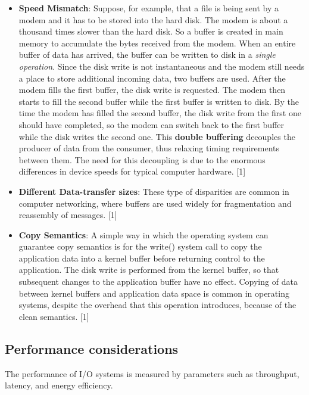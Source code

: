 \documentclass[a4paper]{article}
\begin{document}
\begin{itemize}
    \item \textbf{Speed Mismatch}: Suppose, for example, that a file is being sent
    by a modem and it has to be stored into the hard disk. The modem is about a thousand
    times slower than the hard disk. So a buffer is created in main memory to
    accumulate the bytes received from the modem. When an entire buffer of data
    has arrived, the buffer can be written to disk in a \textit{single operation}. Since the
    disk write is not instantaneous and the modem still needs a place to store
    additional incoming data, two buffers are used. After the modem fills the first
    buffer, the disk write is requested. The modem then starts to fill the second
    buffer while the first buffer is written to disk. By the time the modem has filled
    the second buffer, the disk write from the first one should have completed,
    so the modem can switch back to the first buffer while the disk writes the
    second one. This \textbf{double buffering} decouples the producer of data from the
    consumer, thus relaxing timing requirements between them. The need for this
    decoupling is due to the enormous differences
    in device speeds for typical computer hardware. [1]
    \item \textbf{Different Data-transfer sizes}: These type of disparities are common in
    computer networking, where buffers are used widely for fragmentation and
    reassembly of messages. [1]
    \item \textbf{Copy Semantics}: A simple way in which the operating system can
    guarantee copy semantics is for the write() system call to copy the application
    data into a kernel buffer before returning control to the application. The disk
    write is performed from the kernel buffer, so that subsequent changes to the
    application buffer have no effect. Copying of data between kernel buffers and
    application data space is common in operating systems, despite the overhead
    that this operation introduces, because of the clean semantics. [1]
\end{itemize}

\subsection{Performance considerations}

The performance of I/O systems is measured by parameters such as throughput, latency, and energy efficiency.
\end{document}
